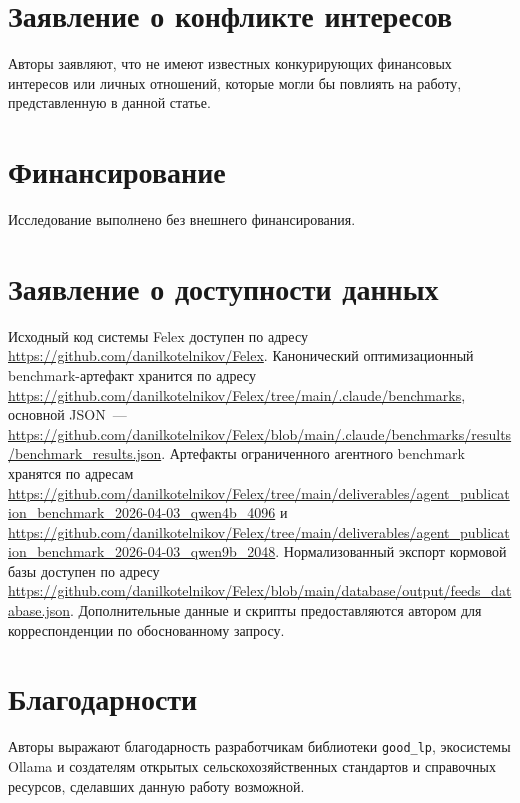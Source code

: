 \documentclass[a4paper,fleqn]{cas-sc}
\begin{document}

\section*{Заявление о конфликте интересов}

Авторы заявляют, что не имеют известных конкурирующих финансовых интересов или личных отношений, которые могли бы повлиять на работу, представленную в данной статье.

\section*{Финансирование}

Исследование выполнено без внешнего финансирования.

\section*{Заявление о доступности данных}

Исходный код системы Felex доступен по адресу \url{https://github.com/danilkotelnikov/Felex}. Канонический оптимизационный benchmark-артефакт хранится по адресу \url{https://github.com/danilkotelnikov/Felex/tree/main/.claude/benchmarks}, основной JSON~--- \url{https://github.com/danilkotelnikov/Felex/blob/main/.claude/benchmarks/results/benchmark_results.json}. Артефакты ограниченного агентного benchmark хранятся по адресам \url{https://github.com/danilkotelnikov/Felex/tree/main/deliverables/agent_publication_benchmark_2026-04-03_qwen4b_4096} и \url{https://github.com/danilkotelnikov/Felex/tree/main/deliverables/agent_publication_benchmark_2026-04-03_qwen9b_2048}. Нормализованный экспорт кормовой базы доступен по адресу \url{https://github.com/danilkotelnikov/Felex/blob/main/database/output/feeds_database.json}. Дополнительные данные и скрипты предоставляются автором для корреспонденции по обоснованному запросу.

\section*{Благодарности}

Авторы выражают благодарность разработчикам библиотеки \texttt{good\_lp}, экосистемы Ollama и создателям открытых сельскохозяйственных стандартов и справочных ресурсов, сделавших данную работу возможной.
\end{document}

